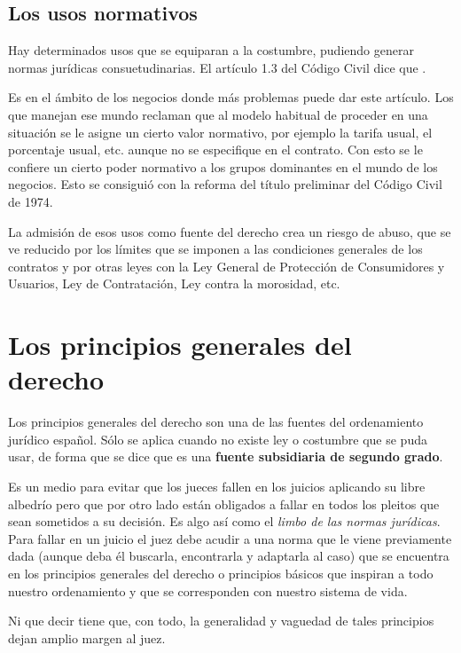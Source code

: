 \documentclass[a4paper,12pt]{report}
\begin{document}
\subsection{Los usos normativos}

Hay determinados usos que se equiparan a la costumbre, pudiendo generar normas jurídicas consuetudinarias. El artículo 1.3 del Código Civil dice que .

Es en el ámbito de los negocios donde más problemas puede dar este artículo. Los que manejan ese mundo reclaman que al modelo habitual de proceder en una situación se le asigne un cierto valor normativo, por ejemplo la tarifa usual, el porcentaje usual, etc. aunque no se especifique en el contrato. Con esto se le confiere un cierto poder normativo a los grupos dominantes en el mundo de los negocios. Esto se consiguió con la reforma del título preliminar del Código Civil de 1974.

La admisión de esos usos como fuente del derecho crea un riesgo de abuso, que se ve reducido por los límites que se imponen a las condiciones generales de los contratos y por otras leyes con la Ley General de Protección de Consumidores y Usuarios, Ley de Contratación, Ley contra la morosidad, etc.

\section{Los principios generales del derecho}

Los principios generales del derecho son una de las fuentes del ordenamiento jurídico español. Sólo se aplica cuando no existe ley o costumbre que se puda usar, de forma que se dice que es una \textbf{fuente subsidiaria de segundo grado}.

Es un medio para evitar que los jueces fallen en los juicios aplicando su libre albedrío pero que por otro lado están obligados a fallar en todos los pleitos que sean sometidos a su decisión. Es algo así como el \textit{limbo de las normas jurídicas}. Para fallar en un juicio el juez debe acudir a una norma que le viene previamente dada (aunque deba él buscarla, encontrarla y adaptarla al caso) que se encuentra en los principios generales del derecho o principios básicos que inspiran a todo nuestro ordenamiento y que se corresponden con nuestro sistema de vida.

Ni que decir tiene que, con todo, la generalidad y vaguedad de tales principios dejan amplio margen al juez.
\end{document}
